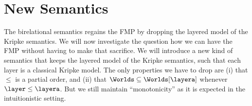 \newcommand{\kripkeplus}{layered\xspace}


\section{New Semantics}
\label{sec:background}

The birelational semantics regains the FMP by dropping the layered model of the Kripke semantics. We will now investigate the question how we can have the FMP without having to make that sacrifice. We will introduce a new kind of semantics that keeps the layered model of the Kripke semantics, such that each layer is a classical Kripke model. The only properties we have to drop are (i) that $\le$ is a partial order, and (ii) that $\Worlds\subseteq\Worlds[\layera]$ whenever $\layer\le\layera$. But we still maintain ``monotonicity'' as it is expected in the intuitionistic setting.


